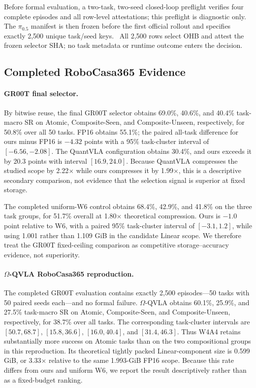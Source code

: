 Before formal evaluation, a two-task, two-seed closed-loop preflight verifies four complete episodes and all row-level attestations; this preflight is diagnostic only. The $\pi_{0.5}$ manifest is then frozen before the first official rollout and specifies exactly 2,500 unique task/seed keys. \PiSelectorRunStatus\ All 2,500 rows select OHB and attest the frozen selector SHA; no task metadata or runtime outcome enters the decision.

\subsection{Completed RoboCasa365 Evidence}
\label{sec:main_results}



\paragraph{GR00T final selector.}
By bitwise reuse, the final GR00T selector obtains 69.0\%, 40.6\%, and 40.4\% task-macro SR on Atomic, Composite-Seen, and Composite-Unseen, respectively, for 50.8\% over all 50 tasks. FP16 obtains 55.1\%; the paired all-task difference for ours minus FP16 is $-4.32$ points with a 95\% task-cluster interval of $[-6.56,-2.08]$. The QuantVLA configuration obtains 30.4\%, and ours exceeds it by 20.3 points with interval $[16.9,24.0]$. Because QuantVLA compresses the studied scope by 2.22$\times$ while ours compresses it by 1.99$\times$, this is a descriptive secondary comparison, not evidence that the selection signal is superior at fixed storage.

The completed uniform-W6 control obtains 68.4\%, 42.9\%, and 41.8\% on the three task groups, for 51.7\% overall at 1.80$\times$ theoretical compression. Ours is $-1.0$ point relative to W6, with a paired 95\% task-cluster interval of $[-3.1,1.2]$, while using 1.001 rather than 1.109 GiB in the candidate Linear scope. We therefore treat the GR00T fixed-ceiling comparison as competitive storage--accuracy evidence, not superiority.

\paragraph{$\Omega$-QVLA RoboCasa365 reproduction.}
The completed GR00T evaluation contains exactly 2,500 episodes---50 tasks with 50 paired seeds each---and no formal failure. $\Omega$-QVLA obtains 60.1\%, 25.9\%, and 27.5\% task-macro SR on Atomic, Composite-Seen, and Composite-Unseen, respectively, for 38.7\% over all tasks. The corresponding task-cluster intervals are $[50.7,68.7]$, $[15.8,36.6]$, $[16.0,40.4]$, and $[31.4,46.3]$. Thus W4A4 retains substantially more success on Atomic tasks than on the two compositional groups in this reproduction. Its theoretical tightly packed Linear-component size is 0.599 GiB, or 3.33$\times$ relative to the same 1.993-GiB FP16 scope. Because this rate differs from ours and uniform W6, we report the result descriptively rather than as a fixed-budget ranking.

